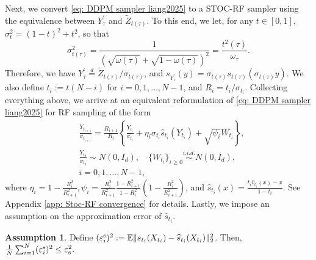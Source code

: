 \documentclass{article}
\theoremstyle{plain}
\theoremstyle{definition}
\newtheorem{assumption}[theorem]{Assumption}
\theoremstyle{remark}
\def\bbE{\mathbb{E}}
\def\Norm#1{\Vert#1\Vert}
\def\escore{\varepsilon^{\rm s}}
\def\meanescore{\varepsilon_{\rm s}}
\newcommand{\bc}[1]{\left\{{#1}\right\}}
\newcommand{\br}[1]{\left({#1}\right)}
\begin{document}
 Next, we convert \eqref{eq: DDPM sampler liang2025} to a STOC-RF sampler using the equivalence between $Y^\prime_\tau$ and $\tilde Z_{t(\tau)}$.  To this end, we let, for any $t \in [0,1]$, $\sigma_t^2 = (1 -t)^2 + t^2$, so that 
 \begin{equation*}
 \sigma_{t(\tau)}^2 = \frac{1}{(\sqrt{\omega(\tau)} + \sqrt{1 - \omega(\tau)})^2} = \frac{t^2(\tau)}{\omega_\tau}.
 \end{equation*}
 Therefore, we have $Y^\prime _\tau \overset{d}{ = } \tilde Z_{t(\tau)}/ \sigma_{t(\tau)} $, and $s_{Y^\prime_\tau}(y) = \sigma_{t(\tau)} s_{t(\tau)}(\sigma_{t(\tau)} y)$. We also define $t_i := t(N - i)$ for $i = 0 , 1, \ldots, N-1$, and $R_i = t_i/ \sigma_{t_i}$.
 Collecting everything above, we arrive at an equivalent reformulation of \eqref{eq: DDPM sampler liang2025} for RF sampling of the form 
 \begin{equation}
     \label{eq: stoc-RF sampler non-Eulerian}
     \begin{aligned}
      &\frac{Y_{t_{i+1}}}{\sigma_{t_{i+1}}} = \frac{R_{i+1}}{R_i} \bc{ \frac{Y_{t_i}}{\sigma_{t_i}} + \eta_i \sigma_{t_i} \widehat s_{t_i}(Y_{t_i}) + \sqrt{\psi_i} W_{t_i}},\\
      &  \frac{Y_{t_0}}{\sigma_{t_0}} \sim N(0,  I_d), \quad \{W_{t_i}\}_{i \ge 0}\overset{i.i.d.}{\sim} N(0,I_d),\\
      & i = 0, 1, \ldots, N-1,
     \end{aligned}
 \end{equation}
 where $ \eta_i = 1- \frac{R_i^2}{R_{i+1}^2},   \psi_i = \frac{R_i^2}{R_{i+1}^2} \frac{ 1 - R_{i+1}^2}{1  - R_i^2} \br{1 - \frac{R_i^2}{R_{i+1}^2}}$, and $\widehat s_{t_i}(x) = \frac{t_i \widehat v_{t_i}(x) - x}{1 - t_i}$. See Appendix \ref{app: Stoc-RF convergence} for details. Lastly, we impose an assumption on the approximation error of $\widehat s_{t_i}$.
 \begin{assumption}
     \label{assumption: score approximation error stoc-RF}
     Define $(\escore_i)^2:= \bbE \Norm{s_{t_i}(X_{t_i}) - \widehat{s}_{t_i}(X_{t_i})}_2^2$. Then, 
    $\frac{1}{N} \sum_{i =1}^N (\escore_i)^2 \le \meanescore^2.$
 \end{assumption}
\end{document}
